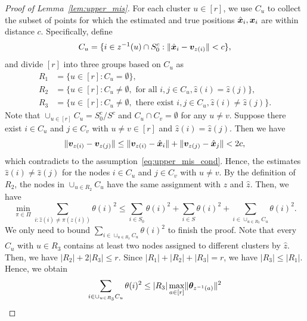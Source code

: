 \documentclass[journal]{IEEEtran}
\theoremstyle{definition}
\theoremstyle{definition}
\def\fixme#1#2{\textbf{\color{red}[FIXME (#1): #2]}}
\begin{document}
\begin{proof}[Proof of Lemma~\ref{lem:upper_mis}] 

For each cluster $u\in[r]$, we use $C_u$ to collect the subset of points for which the estimated and true positions $\hat {\bm x}_i, \bm x_i$ are within distance $c$. Specifically, define
\begin{equation}
    C_u = \{ i \in z^{-1}(u) \cap S_0^c: \lVert\hat {\bm x}_i - \bm{v}_{z(i)}\rVert < c \},
\end{equation}
and divide $[r]$ into three groups based on $C_u$ as 
\begin{align}
    R_1 &= \{ u \in [r]: C_u = \emptyset \},\\
    R_2 &= \{ u \in [r]: C_u \neq \emptyset, \text{ for all } i, j \in C_u, \hat z(i) = \hat z(j) \},\\
    R_3 &= \{ u \in [r]: C_u \neq \emptyset, \text{ there exist } i, j \in C_u, \hat z(i) \neq \hat z(j) \}.
\end{align}
Note that $\cup_{u \in [r]}C_u = S_0^c/S^c$ and $C_u \cap C_v = \emptyset$ for any $u \neq v$. Suppose there exist $ i \in C_u$ and $j \in C_v$ with $u \neq v \in [r]$ and $\hat z(i) = \hat z(j)$. Then we have 
\begin{equation}
    \lVert\bm{v}_{z(i)} - \bm{v}_{z(j)} \rVert \leq  \lVert\bm{v}_{z(i)} - \hat {\bm x}_{i} \rVert + \lVert\bm{v}_{z(j)} - \hat {\bm x}_j \rVert < 2c,
\end{equation}
which contradicts to the assumption~\eqref{eq:upper_mis_cond}. Hence, the estimates $\hat z(i) \neq \hat z(j)$ for the nodes $ i \in C_u$ and $j \in C_v$ with $u \neq v$. By the definition of $R_2$, the nodes in $\cup_{u \in R_2} C_u$ have the same assignment with $z$ and $\hat z$. Then, 
we have 
\small
\begin{equation}
    \min_{\pi \in \Pi} \sum_{i : \hat z(i) \neq \pi(z(i))} \theta(i)^2 \leq \sum_{i \in S_0} \theta(i)^2 + \sum_{i \in S} \theta(i)^2 + \sum_{ i \in \cup_{u \in R_3} C_u} \theta(i)^2.
\end{equation}
\normalsize
 We only need to bound $\sum_{ i \in \cup_{u \in R_3} C_u} \theta(i)^2$ to finish the proof. Note that every $C_u$ with $u \in R_3$ contains at least two nodes assigned to different clusters by $\hat z$. Then, we have $|R_2| + 2 |R_3| \leq r$. Since $|R_1| + |R_2| + |R_3| = r$, we have $|R_3| \leq |R_1|$. Hence, we obtain
\begin{align}
    \sum_{ i \in \cup_{u \in R_3} C_u} \theta(i)^2 &\leq |R_3| \max_{a \in [r]} \onormSize{}{\mtheta_{z^{-1}(a)}}^2 \\

\end{align}
\end{proof}
\end{document}
